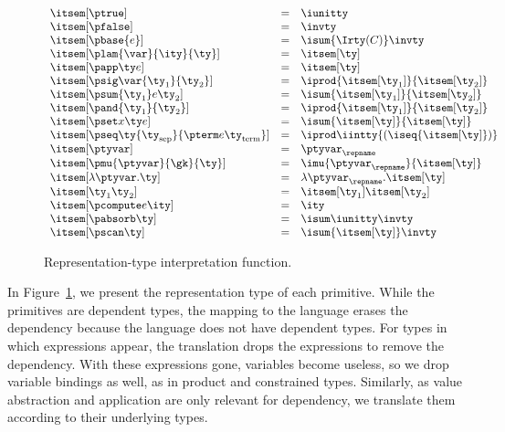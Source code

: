 \begin{figure}
\fbox{$\itsem[\ty] = \ity$}
\[
\begin{array}{lcl} 
\itsem[\ptrue] & = & \iunitty \\
\itsem[\pfalse] & = & \invty \\
\itsem[\pbase{e}] & = & \isum {\Irty(C)} \invty   \\
\itsem[\plam{\var}{\ity}{\ty}] & = & \itsem[\ty] \\
\itsem[\papp \ty e] & = & \itsem[\ty] \\
\itsem[\psig \var {\ty_1} {\ty_2}]  & = & \iprod {\itsem[\ty_1]} {\itsem[\ty_2]}    \\
\itsem[\psum {\ty_1} e {\ty_2}]     & = & \isum {\itsem[\ty_1]} {\itsem[\ty_2]} \\
\itsem[\pand {\ty_1} {\ty_2}]  & = & \iprod {\itsem[\ty_1]}{\itsem[\ty_2]}\\
\itsem[\pset x \ty e] & = & \isum {\itsem[\ty]}{\itsem[\ty]}\\
\itsem[\pseq \ty {\ty_{\text{sep}}} {\pterm e {\ty_{\text{term}}}}] & = & 
    \iprod \iintty {(\iseq{\itsem[\ty]})}             \\
\itsem[\ptyvar] & = & \ptyvar_\repname \\
\itsem[\pmu{\ptyvar}{\gk}{\ty}] & = & \imu{\ptyvar_\repname}{\itsem[\ty]} \\
\itsem[\lambda \ptyvar.\ty]       & = & \lambda \ptyvar_\repname.\itsem[\ty] \\
\itsem[\ty_1 \ty_2]              & = & \itsem[\ty_1] \itsem[\ty_2] \\
\itsem[\pcompute e \ity]                 & = & \ity \\
\itsem[\pabsorb \ty]                     & = & \isum \iunitty \invty \\
\itsem[\pscan \ty] & = & \isum {\itsem[\ty]} \invty
\end{array}
\]
\caption{Representation-type interpretation function.}
\label{fig:rep-tys}
\end{figure}

In Figure~\ref{fig:rep-tys}, we present the representation type of
each \ddc{} primitive. While the primitives are dependent types, the
mapping to the \implang{} language erases the dependency because the
\implang{} language does not have dependent types. For \ddc{} types in
which expressions appear, the translation drops the expressions to
remove the dependency.  With these expressions gone, variables become
useless, so we drop variable bindings as well, as in product and
constrained types.  Similarly, as value abstraction and application are
only relevant for dependency, we translate them according to their
underlying types.

